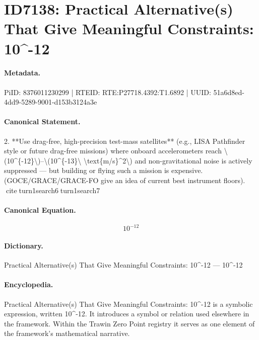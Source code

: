 \section*{ID7138: Practical Alternative(s) That Give Meaningful Constraints: 10\textasciicircum{}-12}
\paragraph{Metadata.}
PiID: 8376011230299 | RTEID: RTE:P27718.4392:T1.6892 | UUID: 51a6d8ed-4dd9-5289-9001-d153b3124a3e

\paragraph{Canonical Statement.}
2. **Use drag-free, high-precision test-mass satellites** (e.g., LISA Pathfinder style or future drag-free missions) where onboard accelerometers reach \textbackslash{}(10\textasciicircum{}\{-12\}\textbackslash{})–\textbackslash{}(10\textasciicircum{}\{-13\}\textbackslash{} \textbackslash{}text\{m/s\}\textasciicircum{}2\textbackslash{}) and non-gravitational noise is actively suppressed — but building or flying such a mission is expensive. (GOCE/GRACE/GRACE-FO give an idea of current best instrument floors). citeturn1search6turn1search7

\paragraph{Canonical Equation.}
\[
10^{-12}
\]

\paragraph{Dictionary.}
Practical Alternative(s) That Give Meaningful Constraints: 10\textasciicircum{}-12 — 10\textasciicircum{}-12

\paragraph{Encyclopedia.}
Practical Alternative(s) That Give Meaningful Constraints: 10\textasciicircum{}-12 is a symbolic expression, written 10\textasciicircum{}-12. It introduces a symbol or relation used elsewhere in the framework. Within the Trawin Zero Point registry it serves as one element of the framework's mathematical narrative.
